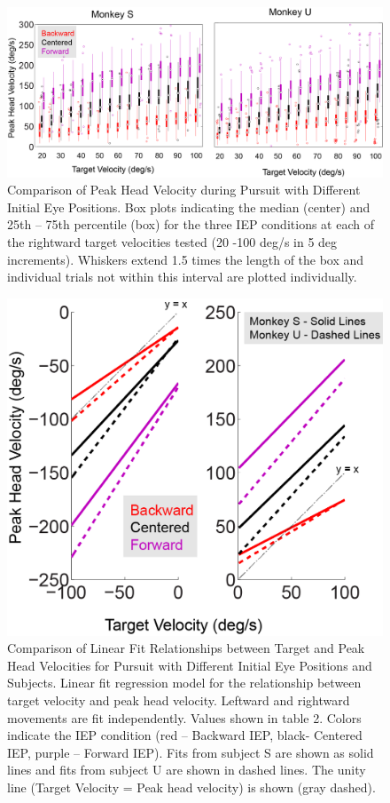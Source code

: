 \documentclass[12pt]{article}
\begin{document}
\begin{figure}[h]
\centering
\includegraphics[width=0.7\linewidth]{./figs/RampBoxplot}
\caption[Peak Head Velocity during Pursuit of Ramp Targets]{Comparison of Peak Head Velocity during Pursuit with Different Initial Eye Positions. Box plots indicating the median (center) and 25th – 75th percentile (box) for the three IEP conditions at each of the rightward target velocities tested (20 -100 deg/s in 5 deg increments). Whiskers extend 1.5 times the length of the box and individual trials not within this interval are plotted individually.}
\label{fig:RampBoxplot}
\end{figure}

\begin{figure}
\centering
\includegraphics[width=0.7\linewidth]{./figs/RampRegressions}
\caption{Comparison of Linear Fit Relationships between Target and Peak Head Velocities for Pursuit with Different Initial Eye Positions and Subjects. Linear fit regression model for the relationship between target velocity and peak head velocity. Leftward and rightward movements are fit independently. Values shown in table 2. Colors indicate the IEP condition (red – Backward IEP, black- Centered IEP, purple – Forward IEP). Fits from subject S are shown as solid lines and fits from subject U are shown in dashed lines. The unity line (Target Velocity = Peak head velocity) is shown (gray dashed).}
\label{fig:RampRegressions}
\end{figure}
\end{document}
